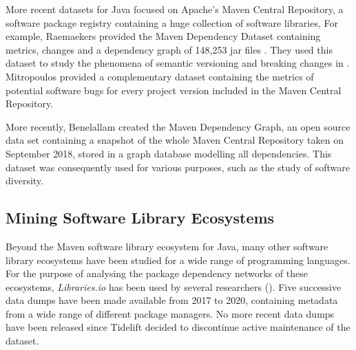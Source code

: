More recent datasets for Java focused on Apache's Maven Central Repository, a software package registry containing a huge collection of software libraries, For example, Raemaekers \etal provided the Maven Dependency Dataset containing metrics, changes and a dependency graph of 148,253 jar files  \cite{Raemaekers2013}. They used this dataset to study the phenomena of semantic versioning and breaking changes in \cite{raemaekers2014semantic}.
Mitropoulos \etal \cite{Mitropoulos2014} provided a complementary dataset containing the metrics of potential software bugs for every project version included in the Maven Central Repository.

More recently, Benelallam \etal \cite{Benelallam2019} created the Maven Dependency Graph, an open source data set containing a snapshot of the whole Maven Central Repository taken on September 2018, stored in a graph database modelling all dependencies. This dataset was consequently used for various purposes, such as the study of software diversity.

\subsection{Mining Software Library Ecosystems}

Beyond the Maven software library ecosystem for Java, many other software library ecosystems have been studied for a wide range of programming languages. For the purpose of analysing the package dependency networks of these ecosystems, \emph{Libraries.io} \cite{librariesio2020} has been used by several researchers (\eg \cite{zerouali2018empirical,decan:emse:2019}). Five successive data dumps have been made available from 2017 to 2020, containing metadata from a wide range of different package managers. No more recent data dumps have been released since Tidelift decided to discontinue active maintenance of the dataset.

